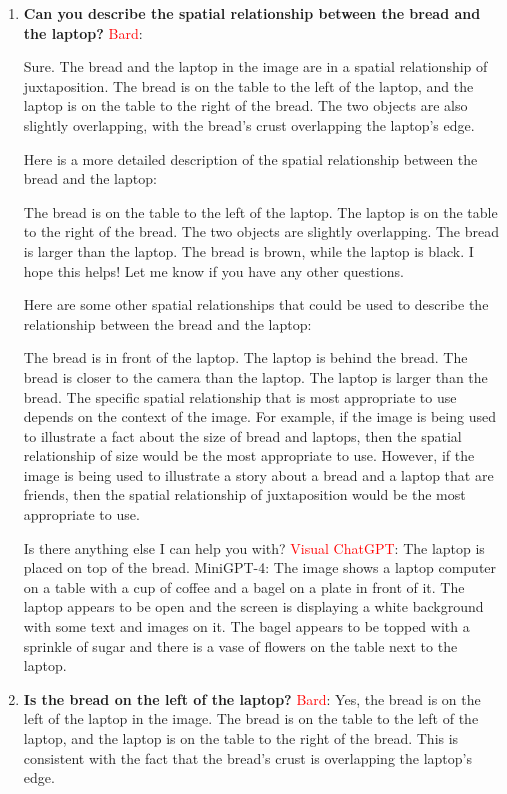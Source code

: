     \begin{enumerate}
        \item \textbf{Can you describe the spatial relationship between the bread and the laptop?}
        \subitem \textcolor{Red}{Bard}:
        
        Sure. The bread and the laptop in the image are in a spatial relationship of juxtaposition. The bread is on the table to the left of the laptop, and the laptop is on the table to the right of the bread. The two objects are also slightly overlapping, with the bread's crust overlapping the laptop's edge.

        Here is a more detailed description of the spatial relationship between the bread and the laptop:

        The bread is on the table to the left of the laptop.
        The laptop is on the table to the right of the bread.
        The two objects are slightly overlapping.
        The bread is larger than the laptop.
        The bread is brown, while the laptop is black.
        I hope this helps! Let me know if you have any other questions.

        Here are some other spatial relationships that could be used to describe the relationship between the bread and the laptop:

        The bread is in front of the laptop.
        The laptop is behind the bread.
        The bread is closer to the camera than the laptop.
        The laptop is larger than the bread.
        The specific spatial relationship that is most appropriate to use depends on the context of the image. For example, if the image is being used to illustrate a fact about the size of bread and laptops, then the spatial relationship of size would be the most appropriate to use. However, if the image is being used to illustrate a story about a bread and a laptop that are friends, then the spatial relationship of juxtaposition would be the most appropriate to use.

        Is there anything else I can help you with?
        \subitem \textcolor{red}{Visual ChatGPT}: The laptop is placed on top of the bread.
        \subitem MiniGPT-4: The image shows a laptop computer on a table with a cup of coffee and a bagel on a plate in front of it. The laptop appears to be open and the screen is displaying a white background with some text and images on it. The bagel appears to be topped with a sprinkle of sugar and there is a vase of flowers on the table next to the laptop.
        \item \textbf{Is the bread on the left of the laptop?}
        \subitem \textcolor{Red}{Bard}: Yes, the bread is on the left of the laptop in the image. The bread is on the table to the left of the laptop, and the laptop is on the table to the right of the bread. This is consistent with the fact that the bread's crust is overlapping the laptop's edge.


\end{enumerate}
